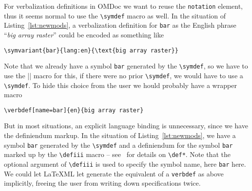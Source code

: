 \documentclass{bluenote}
\def\omdoc{\textsf{OMDoc}\xspace}
\def\latexml{{\LaTeX}ML\xspace}
\def\lstomdoc{\lstinline[language={[1.3]OMDoc}]}
\def\nlex#1{``\emph{#1}''}
\begin{document}
For verbalization definitions in \omdoc we want to reuse the \lstomdoc|notation| element,
thus it seems normal to use the \lstinline|\symdef| macro as well. In the situation of
Listing~\ref{lst:newmods}, a verbalization definition for \lstinline|bar| as the English
phrase \nlex{big array raster} could be encoded as something like
\begin{lstlisting}
\symvariant{bar}{lang:en}{\text{big array raster}}
\end{lstlisting}
Note that we already have a symbol \lstinline|bar| generated by the \lstinline|\symdef|,
so we have to use the \lstiinline|\symvariant| macro for this, if there were no prior
\lstinline|\symdef|, we would have to use a \lstinline|\symdef|. To hide this choice from
the user we hould probably have a wrapper macro
\begin{lstlisting}
\verbdef[name=bar]{en}{big array raster}
\end{lstlisting}
But in most situations, an explicit language binding is unnecessary, since we have the
definiendum markup. In the situation of Listing~\ref{lst:newmods}, we have a symbol
\lstinline|bar| generated by the \lstinline|\symdef| and a definiendum for the symbol
\lstinline|bar| marked up by the \lstinline|\defiii| macro -- see~\cite{Kohlhase:smms:svn}
for details on \lstinline|\def*|. Note that the optional argument of \lstinline|\defiii|
is used to specify the symbol name, here \lstinline|bar| here. We could let \latexml let
generate the equivalent of a \lstinline|verbdef| as above implicitly, freeing the user
from writing down specifications twice. 
\end{document}
